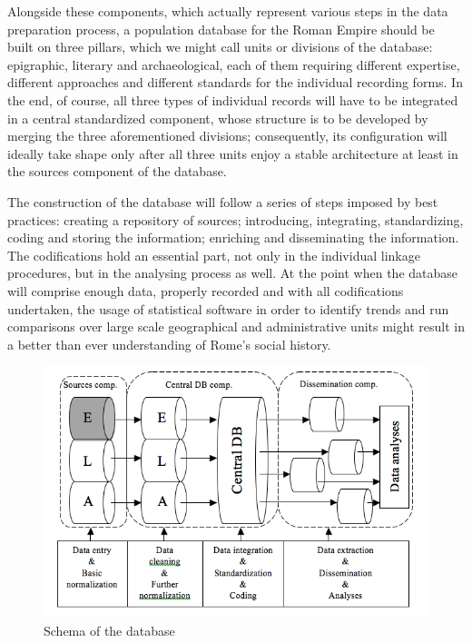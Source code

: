\documentclass[amsthm,ebook]{saparticle}
\begin{document}
Alongside these components, which actually represent various steps in the data preparation process, a population
database for the Roman Empire should be built on three pillars, which we might call units or divisions of the database:
epigraphic, literary and archaeological, each of them requiring different expertise, different approaches and different
standards for the individual recording forms. In the end, of course, all three types of individual records will have to
be integrated in a central standardized component, whose structure is to be developed by merging the three
aforementioned divisions; consequently, its configuration will ideally take shape only after all three units enjoy a
stable architecture at least in the sources component of the database.

The construction of the database will follow a series of steps imposed by best practices: creating a repository of
sources; introducing, integrating, standardizing, coding and storing the information; enriching and disseminating the
information. The codifications hold an essential part, not only in the individual linkage procedures, but in the
analysing process as well. At the point when the database will comprise enough data, properly recorded and with all
codifications undertaken, the usage of statistical software in order to identify trends and run comparisons over large
scale geographical and administrative units might result in a better than ever understanding of Rome’s
social history.


\begin{figure}[!bp]
\centering
\includegraphics[width=\columnwidth]{graph.png}
\caption{Schema of the database}
\label{fig:schemadatabase}
\end{figure}
\end{document}
